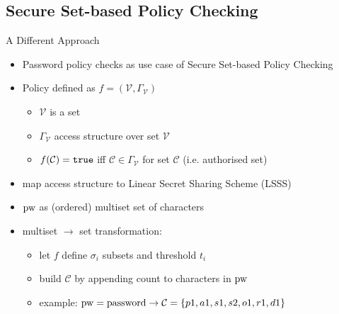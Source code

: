 \documentclass[notes,xcolor=dvipsnames]{beamer}
\begin{document}
\subsection[SPC]{Secure Set-based Policy Checking}

\begin{frame}{A Different Approach}
  \begin{itemize}
    \item Password policy checks as use case of Secure Set-based Policy Checking
    \item Policy defined as $f=(\mathcal{V}, \Gamma_\mathcal{V})$
    \begin{itemize}
      \item $\mathcal{V}$ is a set
      \item $\Gamma_\mathcal{V}$ access structure over set $\mathcal{V}$
      \item $f(\mathcal{C})=\mathtt{true}$ iff $\mathcal{C}\in\Gamma_\mathcal{V}$ for set $\mathcal{C}$ (i.e. authorised set)
    \end{itemize}
    \item map access structure to Linear Secret Sharing Scheme (LSSS)
  \end{itemize}
  
  \begin{itemize}
    \item $\mathrm{pw}$ as (ordered) multiset set of characters
    \item multiset $\rightarrow$ set transformation:
    \begin{itemize}
      \item let $f$ define $\sigma_i$ subsets and threshold $t_i$
      \item build $\mathcal{C}$ by appending count to characters in $\mathrm{pw}$
      \item example: $\mathrm{pw}=\text{password}\rightarrow\mathcal{C}=\{p1,a1,s1,s2,o1,r1,d1\}$
    \end{itemize}
  \end{itemize}
  
\end{frame}
\end{document}
